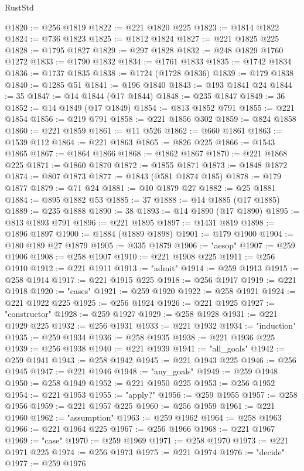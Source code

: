 \begin{lexlean}{RustStd}
\begin{coremodule}
@1820 := @256 @1819
@1822 := @221 @1820 @225
@1823 := @1814 @1822
@1824 := @736 @1823
@1825 := @1812 @1824
@1827 := @221 @1825 @225
@1828 := @1795 @1827
@1829 := @297 @1828
@1832 := @248 @1829 @1760 @1272
@1833 := @1790 @1832
@1834 := @1761 @1833
@1835 := @1742 @1834
@1836 := @1737 @1835
@1838 := @1724 (@1728 @1836)
@1839 := @179 @1838
@1840 := @1285 @51
@1841 := @196 @1840
@1843 := @193 @1841 @24
@1844 := 35
@1847 := @14 @1844 (@17 @1844)
@1848 := @235 @1847
@1849 := 36
@1852 := @14 @1849 (@17 @1849)
@1854 := @813 @1852 @791
@1855 := @221 @1854
@1856 := @219 @791
@1858 := @221 @1856 @302
@1859 := @824 @1858
@1860 := @221 @1859
@1861 := @11 @526
@1862 := @660 @1861
@1863 := @1539 @112
@1864 := @221 @1863
@1865 := @826 @225
@1866 := @1543 @1865
@1867 := @1864 @1866
@1868 := @1862 @1867
@1870 := @221 @1868 @225
@1871 := @1860 @1870
@1872 := @1855 @1871
@1873 := @1848 @1872
@1874 := @807 @1873
@1877 := @1843 (@581 @1874 @185)
@1878 := @179 @1877
@1879 := @71 @24
@1881 := @10 @1879 @27
@1882 := @25 @1881
@1884 := @895 @1882 @53
@1885 := 37
@1888 := @14 @1885 (@17 @1885)
@1889 := @235 @1888
@1890 := 38
@1893 := @14 @1890 (@17 @1890)
@1895 := @813 @1893 @791
@1896 := @221 @1895
@1897 := @1431 @819
@1898 := @1896 @1897
@1900 := @1884 (@1889 @1898)
@1901 := @179 @1900
@1904 := @180 @189 @27 @1879
@1905 := @335 @1879
@1906 := "aesop"
@1907 := @259 @1906
@1908 := @258 @1907
@1910 := @221 @1908 @225
@1911 := @256 @1910
@1912 := @221 @1911
@1913 := "admit"
@1914 := @259 @1913
@1915 := @258 @1914
@1917 := @221 @1915 @225
@1918 := @256 @1917
@1919 := @221 @1918
@1920 := "cases"
@1921 := @259 @1920
@1922 := @258 @1921
@1924 := @221 @1922 @225
@1925 := @256 @1924
@1926 := @221 @1925
@1927 := "constructor"
@1928 := @259 @1927
@1929 := @258 @1928
@1931 := @221 @1929 @225
@1932 := @256 @1931
@1933 := @221 @1932
@1934 := "induction"
@1935 := @259 @1934
@1936 := @258 @1935
@1938 := @221 @1936 @225
@1939 := @256 @1938
@1940 := @221 @1939
@1941 := "all_goals"
@1942 := @259 @1941
@1943 := @258 @1942
@1945 := @221 @1943 @225
@1946 := @256 @1945
@1947 := @221 @1946
@1948 := "any_goals"
@1949 := @259 @1948
@1950 := @258 @1949
@1952 := @221 @1950 @225
@1953 := @256 @1952
@1954 := @221 @1953
@1955 := "apply?"
@1956 := @259 @1955
@1957 := @258 @1956
@1959 := @221 @1957 @225
@1960 := @256 @1959
@1961 := @221 @1960
@1962 := "assumption"
@1963 := @259 @1962
@1964 := @258 @1963
@1966 := @221 @1964 @225
@1967 := @256 @1966
@1968 := @221 @1967
@1969 := "case"
@1970 := @259 @1969
@1971 := @258 @1970
@1973 := @221 @1971 @225
@1974 := @256 @1973
@1975 := @221 @1974
@1976 := "decide"
@1977 := @259 @1976

\end{coremodule}
\end{lexlean}
